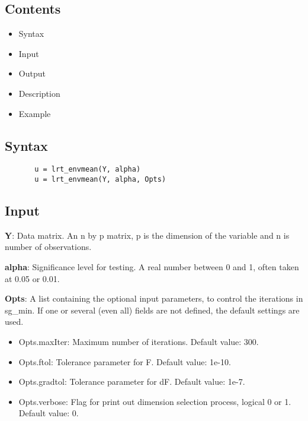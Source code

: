 \documentclass[a4paper,11pt,openany]{memoir}
\begin{document}
\subsection*{Contents}

\begin{itemize}
\setlength{\itemsep}{-1ex}
   \item Syntax
   \item Input
   \item Output
   \item Description
   \item Example
\end{itemize}


\subsection*{Syntax}


\begin{verbatim}       u = lrt_envmean(Y, alpha)
       u = lrt_envmean(Y, alpha, Opts)\end{verbatim}
    

\subsection*{Input}

\begin{par}
\textbf{Y}: Data matrix. An n by p matrix, p is the dimension of the variable and n is number of observations.
\end{par} \vspace{1em}
\begin{par}
\textbf{alpha}: Significance level for testing.  A real number between 0 and 1, often taken at 0.05 or 0.01.
\end{par} \vspace{1em}
\begin{par}
\textbf{Opts}: A list containing the optional input parameters, to control the iterations in sg\_min. If one or several (even all) fields are not defined, the default settings are used.
\end{par} \vspace{1em}
\begin{itemize}
\setlength{\itemsep}{-1ex}
   \item Opts.maxIter: Maximum number of iterations.  Default value: 300.
   \item Opts.ftol: Tolerance parameter for F.  Default value: 1e-10.
   \item Opts.gradtol: Tolerance parameter for dF.  Default value: 1e-7.
   \item Opts.verbose: Flag for print out dimension selection process, logical 0 or 1. Default value: 0.
\end{itemize}
\end{document}
